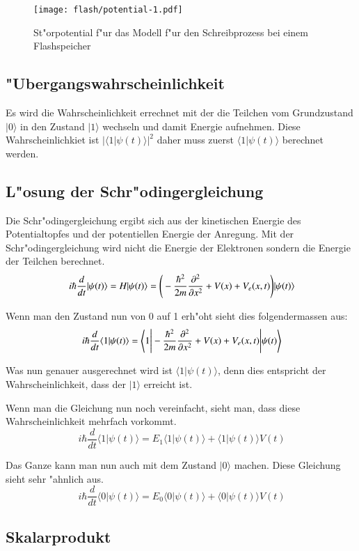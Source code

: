 \begin{refsection}
\begin{figure}
\centering
\texttt{[image: flash/potential-1.pdf]}
\caption{St"orpotential f"ur das Modell f"ur den Schreibprozess bei
einem Flashspeicher
\label{flash:Anregung}}
\end{figure}

\subsection{"Ubergangswahrscheinlichkeit}
Es wird die Wahrscheinlichkeit errechnet mit der die Teilchen
vom Grundzustand $|0\rangle$ in den Zustand $|1\rangle$ wechseln
und damit Energie aufnehmen. 
Diese Wahrscheinlichkiet ist $\vert\langle1|\psi(t)\rangle\vert^2$
daher muss zuerst $\langle1|\psi(t)\rangle$ berechnet werden.

\subsection{L"osung der Schr"odingergleichung}
Die Schr"odingergleichung ergibt sich aus der kinetischen Energie des
Potentialtopfes und der potentiellen Energie der Anregung.
Mit der Schr"odingergleichung wird nicht die Energie der Elektronen
sondern die Energie der Teilchen berechnet.
\[
\ i\hbar\frac{d}{dt}|\psi(t)\rangle = H|\psi(t)\rangle = \Bigg{(}-\frac{\hbar^2}{2m} \frac{\partial^2}{\partial x^2}+V(x)+V_{e}(x,t)\Bigg{)}|\psi(t)\rangle
\]

Wenn man den Zustand nun von 0 auf 1 erh"oht sieht dies folgendermassen aus:
\[
\ i\hbar\frac{d}{dt}\langle1|\psi(t)\rangle = \Bigg{\langle}1\Bigg{|}-\frac{\hbar^2}{2m} \frac{\partial^2}{\partial x^2}+V(x)+V_{e}(x,t)\Bigg{|}\psi(t)\Bigg{\rangle}
\]

Was nun genauer ausgerechnet wird ist $\langle1|\psi(t)\rangle$, denn
dies entspricht der Wahrscheinlichkeit, dass der $|1\rangle$ erreicht ist.

Wenn man die Gleichung nun noch vereinfacht, sieht man, dass diese
Wahrscheinlichkeit mehrfach vorkommt.
\[
\ i\hbar\frac{d}{dt}\langle1|\psi(t)\rangle = E_{1}\langle1|\psi(t)\rangle+\langle1|\psi(t)\rangle V(t)
\]

Das Ganze kann man nun auch mit dem Zustand $|0\rangle$ machen. Diese
Gleichung sieht sehr "ahnlich aus.
\[
\ i\hbar\frac{d}{dt}\langle0|\psi(t)\rangle = E_{0}\langle0|\psi(t)\rangle+\langle0|\psi(t)\rangle V(t)
\]

\subsection{Skalarprodukt}


\end{refsection}

